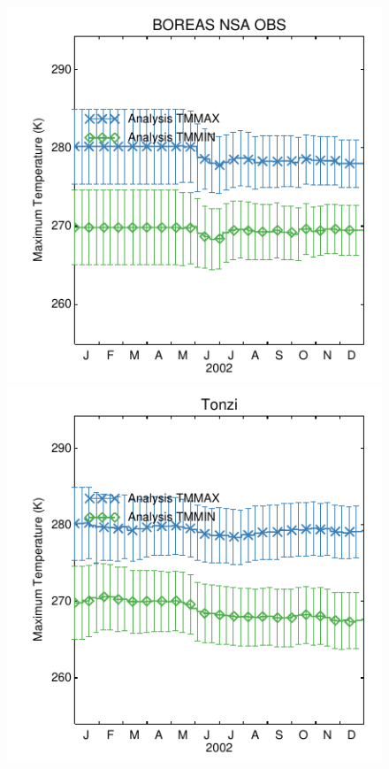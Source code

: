 \documentclass[a4paper,12pt]{article}
\begin{document}
\begin{figure}[hp]
\begin{center}
\includegraphics[scale=0.5]{BOREAS_NSA_OBS.dayplot.2002.TMMAX.MODIS.pdf}
\includegraphics[scale=0.5]{Tonzi.dayplot.2002.TMMAX.MODIS.pdf}

\end{center}
\end{figure}
\end{document}

